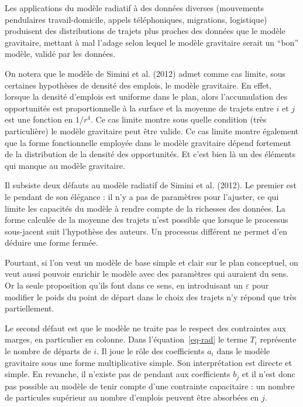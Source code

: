 \documentclass[
  10pt,
  a4paper,
  numbers=noendperiod,
  DIV=9]{scrreprt}
\begin{document}
Les applications du modèle radiatif à des données diverses (mouvements
pendulaires travail-domicile, appels téléphoniques, migrations,
logistique) produisent des distributions de trajets plus proches des
données que le modèle gravitaire, mettant à mal l'adage selon lequel le
modèle gravitaire serait un ``bon'' modèle, validé par les données.

On notera que le modèle de Simini et al. (2012) admet comme cas limite,
sous certaines hypothèses de densité des emplois, le modèle gravitaire.
En effet, lorsque la densité d'emplois est uniforme dans le plan, alors
l'accumulation des opportunités est proportionnelle à la surface et la
moyenne de trajets entre \(i\) et \(j\) est une fonction en \(1/r^4\).
Ce cas limite montre sous quelle condition (très particulière) le modèle
gravitaire peut être valide. Ce cas limite montre également que la forme
fonctionnelle employée dans le modèle gravitaire dépend fortement de la
distribution de la densité des opportunités. Et c'est bien là un des
éléments qui manque au modèle gravitaire.

Il subsiste deux défauts au modèle radiatif de Simini et al. (2012). Le
premier est le pendant de son élégance : il n'y a pas de paramètres pour
l'ajuster, ce qui limite les capacités du modèle à rendre compte de la
richesses des données. La forme calculée de la moyenne des trajets n'est
possible que lorsque le processus sous-jacent suit l'hypothèse des
auteurs. Un processus différent ne permet d'en déduire une forme fermée.

Pourtant, si l'on veut un modèle de base simple et clair sur le plan
conceptuel, on veut aussi pouvoir enrichir le modèle avec des paramètres
qui auraient du sens. Or la seule proposition qu'ils font dans ce sens,
en introduisant un \(\varepsilon\) pour modifier le poids du point de
départ dans le choix des trajets n'y répond que très partiellement.

Le second défaut est que le modèle ne traite pas le respect des
contraintes aux marges, en particulier en colonne. Dans
l'équation~\ref{eq-rad} le terme \(T_i\) représente le nombre de départs
de \(i\). Il joue le rôle des coefficients \(a_i\) dans le modèle
gravitaire sous une forme multiplicative simple. Son interprétation est
directe et simple. En revanche, il n'existe pas de pendant aux
coefficients \(b_j\) et il n'est donc pas possible au modèle de tenir
compte d'une contrainte capacitaire : un nombre de particules supérieur
au nombre d'emplois peuvent être absorbées en \(j\).
\end{document}
